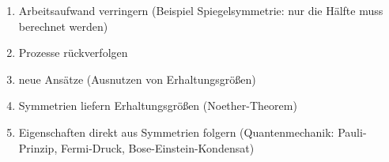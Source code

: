 \begin{enumerate}
            \begin{enumerate}
                \item Arbeitsaufwand verringern (Beispiel Spiegelsymmetrie: nur die Hälfte muss berechnet werden)
                \item Prozesse rückverfolgen 
                \item neue Ansätze (Ausnutzen von Erhaltungsgrößen)
                \item Symmetrien liefern Erhaltungsgrößen (Noether-Theorem)
                \item Eigenschaften direkt aus Symmetrien folgern (Quantenmechanik: Pauli-Prinzip, Fermi-Druck, Bose-Einstein-Kondensat)
            \end{enumerate}
\end{enumerate}

\newpage

